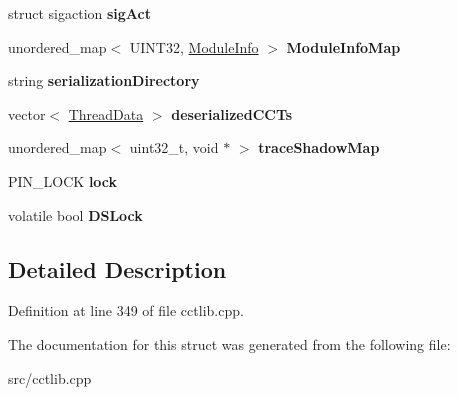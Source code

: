 \begin{DoxyCompactItemize}
\item 
\hypertarget{structPinCCTLib_1_1CCT__LIB__GLOBAL__STATE_a9dc6a4e29e98dbbe2d7e399852644acd}{struct sigaction {\bfseries sig\-Act}}\label{structPinCCTLib_1_1CCT__LIB__GLOBAL__STATE_a9dc6a4e29e98dbbe2d7e399852644acd}

\item 
\hypertarget{structPinCCTLib_1_1CCT__LIB__GLOBAL__STATE_a2251a3f1fb31378d07b258b80cea6825}{unordered\-\_\-map$<$ U\-I\-N\-T32, \hyperlink{structPinCCTLib_1_1ModuleInfo}{Module\-Info} $>$ {\bfseries Module\-Info\-Map}}\label{structPinCCTLib_1_1CCT__LIB__GLOBAL__STATE_a2251a3f1fb31378d07b258b80cea6825}

\item 
\hypertarget{structPinCCTLib_1_1CCT__LIB__GLOBAL__STATE_afc12b9760d0c04043d8300fac1eadc85}{string {\bfseries serialization\-Directory}}\label{structPinCCTLib_1_1CCT__LIB__GLOBAL__STATE_afc12b9760d0c04043d8300fac1eadc85}

\item 
\hypertarget{structPinCCTLib_1_1CCT__LIB__GLOBAL__STATE_ae1ecaa71dd7866da4fa77d13ba220d91}{vector$<$ \hyperlink{structPinCCTLib_1_1ThreadData}{Thread\-Data} $>$ {\bfseries deserialized\-C\-C\-Ts}}\label{structPinCCTLib_1_1CCT__LIB__GLOBAL__STATE_ae1ecaa71dd7866da4fa77d13ba220d91}

\item 
\hypertarget{structPinCCTLib_1_1CCT__LIB__GLOBAL__STATE_a39ae1711b7029c0b8ac933148e7a9521}{unordered\-\_\-map$<$ uint32\-\_\-t, void $\ast$ $>$ {\bfseries trace\-Shadow\-Map}}\label{structPinCCTLib_1_1CCT__LIB__GLOBAL__STATE_a39ae1711b7029c0b8ac933148e7a9521}

\item 
\hypertarget{structPinCCTLib_1_1CCT__LIB__GLOBAL__STATE_ad0f3858e50e263e20210514e0a873284}{P\-I\-N\-\_\-\-L\-O\-C\-K {\bfseries lock}}\label{structPinCCTLib_1_1CCT__LIB__GLOBAL__STATE_ad0f3858e50e263e20210514e0a873284}

\item 
\hypertarget{structPinCCTLib_1_1CCT__LIB__GLOBAL__STATE_af3fde3418f29d9bdfdb52830dcbd74c0}{volatile bool {\bfseries D\-S\-Lock}}\label{structPinCCTLib_1_1CCT__LIB__GLOBAL__STATE_af3fde3418f29d9bdfdb52830dcbd74c0}

\end{DoxyCompactItemize}


\subsection{Detailed Description}


Definition at line 349 of file cctlib.\-cpp.



The documentation for this struct was generated from the following file\-:\begin{DoxyCompactItemize}
\item 
src/cctlib.\-cpp\end{DoxyCompactItemize}
